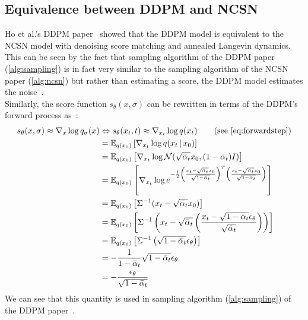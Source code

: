\documentclass{article}
\numberwithin{equation}{section}
\numberwithin{figure}{section}
\begin{document}
\subsection{Equivalence between DDPM and NCSN}
Ho et al.'s DDPM paper~\cite{ho2020denoising} showed that the DDPM model is equivalent to the NCSN model with denoising score matching and annealed Langevin dynamics. \\
This can be seen by the fact that sampling algorithm of the DDPM paper (\ref{alg:sampling}) is in fact very similar to the sampling algorithm of the NCSN paper (\ref{alg:ncsn}) but rather than estimating a score, the DDPM model estimates the noise~\cite{ho2020denoising}. \\
Similarly, the score function $s_\theta (x, \sigma)$ can be rewritten in terms of the DDPM's forward process as~\cite{weng2021diffusion}:
{
  \allowdisplaybreaks
  \begin{align}
    s_\theta (x, \sigma) \approx \nabla_x \log q_\sigma (x) &\Leftrightarrow s_\theta (x_t, t) \approx \nabla_{x_t} \log q(x_t) \qquad \text{(see \ref{eq:forwardstep})} \label{eq:scoreestimation} \\
    &= \mathbb{E}_{q (x_0)} \left[ \nabla_{x_t} \log q(x_t \, | \, x_0) \right] \\
    &= \mathbb{E}_{q (x_0)} \left[ \nabla_{x_t} \log \mathcal{N} (\sqrt{\bar{\alpha}_t} x_0, (1 - \bar{\alpha}_t) I) \right] \\
    &= \mathbb{E}_{q (x_0)} \left[ \nabla_{x_t} \log e^{- \frac{1}{2} \left( \frac{x_t - \sqrt{\bar{\alpha}_t} x_0}{\sqrt{1 - \bar{\alpha}_t}} \right)^T \left( \frac{x_t - \sqrt{\bar{\alpha}_t} x_0}{\sqrt{1 - \bar{\alpha}_t}} \right)} \right] \\
    &= \mathbb{E}_{q (x_0)} \left[ \Sigma^{-1} (x_t - \sqrt{\bar{\alpha}_t} x_0) \right] \\
    &= \mathbb{E}_{q (x_0)} \left[ \Sigma^{-1} \left(x_t - \sqrt{\bar{\alpha}_t} \left( \frac{x_t - \sqrt{1 - \bar{\alpha}_t} \epsilon_\theta}{\sqrt{\bar{\alpha}_t}} \right) \right) \right] \\
    &= \mathbb{E}_{q (x_0)} \left[ \Sigma^{-1} \left( \sqrt{1 - \bar{\alpha}_t} \epsilon_\theta \right) \right] \\
    &= - \frac{1}{1 - \bar{\alpha}_t}  \sqrt{1 - \bar{\alpha}_t} \epsilon_\theta \\
    &= - \frac{\epsilon_\theta}{\sqrt{1 - \bar{\alpha}_t}}
  \end{align}
  We can see that this quantity is used in sampling algorithm (\ref{alg:sampling}) of the DDPM paper~\cite{ho2020denoising}. 
}
\end{document}
